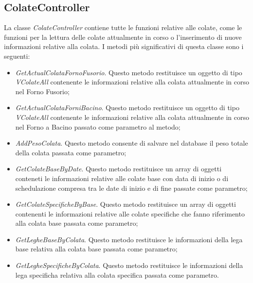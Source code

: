   \subsection{ColateController}
  La classe \textit{ColateController} contiene tutte le funzioni relative alle colate, come le funzioni per la lettura delle
  colate attualmente in corso o l'inserimento di nuove informazioni relative alla colata. I metodi più significativi
  di questa classe sono i seguenti:
  \begin{itemize}
    \item \textit{GetActualColataFornoFusorio}. Questo metodo restituisce un oggetto di tipo \textit{VColateAll}
    contenente le informazioni relative alla colata attualmente in corso nel Forno Fusorio;
    \item \textit{GetActualColataForniBacino}. Questo metodo restituisce un oggetto di tipo \textit{VColateAll}
    contenente le informazioni relative alla colata attualmente in corso nel Forno a Bacino passato come parametro al metodo;
    \item \textit{AddPesoColata}. Questo metodo consente di salvare nel database il peso totale della colata passata
    come parametro;
    \item \textit{GetColateBaseByDate}. Questo metodo restituisce un array di oggetti conteneti le informazioni relative
    alle colate base con data di inizio o di schedulazione compresa tra le date di inizio e di fine passate come parametro;
    \item \textit{GetColateSpecificheByBase}. Questo metodo restituisce un array di oggetti contenenti le informazioni
    relative alle colate specifiche che fanno riferimento alla colata base passata come parametro;
    \item \textit{GetLegheBaseByColata}. Questo metodo restituisce le informazioni della lega base relativa alla
    colata base passata come parametro;
    \item \textit{GetLegheSpecificheByColata}. Questo metodo restituisce le informazioni della lega specificha relativa
    alla colata specifica passata come parametro.
  \end{itemize}

